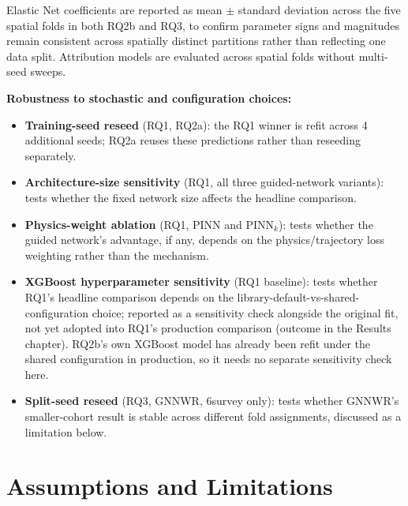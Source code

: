Elastic Net coefficients are reported as mean $\pm$ standard deviation across the five spatial folds in both RQ2b and RQ3, to confirm parameter signs and magnitudes remain consistent across spatially distinct partitions rather than reflecting one data split. Attribution models are evaluated across spatial folds without multi-seed sweeps.

\textbf{Robustness to stochastic and configuration choices:} %
\begin{itemize}
\setlength\itemsep{0pt}
\item \textbf{Training-seed reseed} (RQ1, RQ2a): the RQ1 winner is refit across 4 additional seeds; RQ2a reuses these predictions rather than reseeding separately.
\item \textbf{Architecture-size sensitivity} (RQ1, all three guided-network variants): tests whether the fixed network size affects the headline comparison.
\item \textbf{Physics-weight ablation} (RQ1, PINN and PINN$_k$): tests whether the guided network's advantage, if any, depends on the physics/trajectory loss weighting rather than the mechanism.
\item \textbf{XGBoost hyperparameter sensitivity} (RQ1 baseline): tests whether RQ1's headline comparison depends on the library-default-vs-shared-configuration choice; reported as a sensitivity check alongside the original fit, not yet adopted into RQ1's production comparison (outcome in the Results chapter). RQ2b's own XGBoost model has already been refit under the shared configuration in production, so it needs no separate sensitivity check here.
\item \textbf{Split-seed reseed} (RQ3, GNNWR, 6survey only): tests whether GNNWR's smaller-cohort result is stable across different fold assignments, discussed as a limitation below.
\end{itemize} 



\section{Assumptions and Limitations}
\label{sec:limitations}

